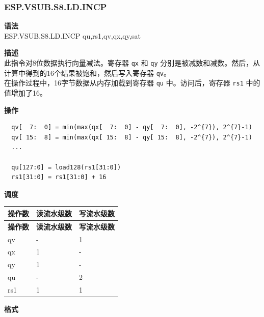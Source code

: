 \newpage

\newpage
\subsubsection{ESP.VSUB.S8.LD.INCP}\label{instruction:ESPVSUBS8LDINCP}
\textbf{语法}\\
ESP.VSUB.S8.LD.INCP qu,rs1,qv,qx,qy,sat

\textbf{描述}\\
此指令对8位数据执行向量减法。寄存器 \lstinline{qx} 和 \lstinline{qy} 分别是被减数和减数。然后，从计算中得到的16个结果被饱和，然后写入寄存器 \lstinline{qv}。\\ 在操作过程中，16字节数据从内存加载到寄存器 \lstinline{qu} 中。访问后，寄存器 \lstinline{rs1} 中的值增加了16。

\textbf{操作}\\
\begin{lstlisting}
  qv[  7:  0] = min(max(qx[  7:  0] - qy[  7:  0], -2^{7}), 2^{7}-1)
  qv[ 15:  8] = min(max(qx[ 15:  8] - qy[ 15:  8], -2^{7}), 2^{7}-1)
  ...

  qu[127:0] = load128(rs1[31:0])
  rs1[31:0] = rs1[31:0] + 16
\end{lstlisting}


\textbf{调度}\\
\begin{longtable}[c]{|l|l|l|}
    \hline
    \rowcolor{lightgray}
    \textbf{操作数} & \textbf{读流水级数} & \textbf{写流水级数} \\\hline
    \endfirsthead
    \hline
    \rowcolor{lightgray}
     \textbf{操作数} & \textbf{读流水级数} & \textbf{写流水级数} \\\hline
    \endhead
    \hline
    \endfoot

  qv & - & 1 \\\hline
    qx & 1 & - \\\hline
    qy & 1 & - \\\hline
    qu & - & 2 \\\hline
    rs1 & 1 & 1

\end{longtable}

\textbf{格式}\\

